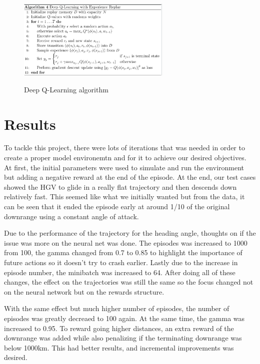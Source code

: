 \documentclass[11pt]{article} %
\begin{document}
   \begin{figure}[H]
      \centering
        \includegraphics[width=0.65\textwidth]{images/alg.png}
        \caption{ Deep Q-Learning algorithm }
      \label{fig:compare}
      \caption{}
   \end{figure}

\section{Results}
To tackle this project, there were lots of iterations that was needed in order to create a proper model environemtn and for it 
to achieve our desired objectives. At first, the initial parameters were used to simulate and run the environment but adding a negative reward at the end 
of the episode. At the end, our test cases showed the HGV to glide in a really flat trajectory and then descends down 
relatively fast. This seemed like what we initially wanted but from the data, it can be seen that it ended the episode 
early at around 1/10 of the original downrange using a constant angle of attack. 

Due to the performance of the trajectory for the heading angle, thoughts on if the issue was more on the neural net was done. 
The episodes was increased to 1000 from 100, the gamma changed from 0.7 to 0.85 to highlight the importance of future actions so it doesn't try to crash earlier. 
Lastly due to the increase in episode number, the minibatch was increased to 64. After doing all of these changes, the effect on the trajectories 
was still the same so the focus changed not on the neural network but on the rewards structure.

With the same effect but much higher number of episodes, the number of episodes was greatly decreaed to 100 again. At the same time, the gamma was increased to 0.95.
To reward going higher distances, an extra reward of the downrange was added while also penalizing if the terminating downrange was below 1000km. This had better results,
and incremental improvements was desired.
\end{document}
